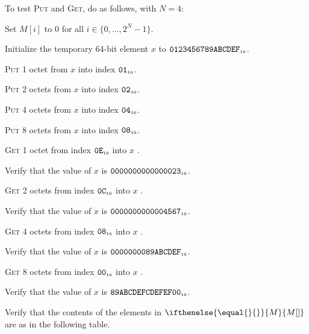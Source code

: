 \documentclass[a4paper,12pt]{article}
\newcommand{\num}[1]{\texttt{#1}}
\newcommand{\hex}[1]{\num{#1}_{\textup{\tiny 16}}}
\newcommand{\MEM}[1]{\ifthenelse{\equal{#1}{}}{M}{M[#1]}}
\newcommand{\range}[2]{\{#1,\ldots,#2\}}
\newcommand{\proc}[1]{\textsc{#1}}
\begin{document}
To test \proc{Put} and \proc{Get}, do as follows, with $N=4$:
\begin{stepnumbers}
\item Set $M[i]$ to 0 for all $i \in \range{0}{2^N-1}$.
\item Initialize the temporary 64-bit element $x$ to $\hex{0123456789ABCDEF}$.
\item \proc{Put} 1 octet  from $x$ into index $\hex{01}$.
\item \proc{Put} 2 octets from $x$ into index $\hex{02}$.
\item \proc{Put} 4 octets from $x$ into index $\hex{04}$.
\item \proc{Put} 8 octets from $x$ into index $\hex{08}$.
\item \proc{Get} 1 octet  from index $\hex{0E}$ into $x$ .
\item Verify that the value of $x$ is $\hex{0000000000000023}$.
\item \proc{Get} 2 octets from index $\hex{0C}$ into $x$ .
\item Verify that the value of $x$ is $\hex{0000000000004567}$.
\item \proc{Get} 4 octets from index $\hex{08}$ into $x$ .
\item Verify that the value of $x$ is $\hex{0000000089ABCDEF}$.
\item \proc{Get} 8 octets from index $\hex{00}$ into $x$ .
\item Verify that the value of $x$ is $\hex{89ABCDEFCDEFEF00}$.
\item Verify that the contents of the elements in $\MEM{}$ are as in the following table.
\end{stepnumbers}
\end{document}

